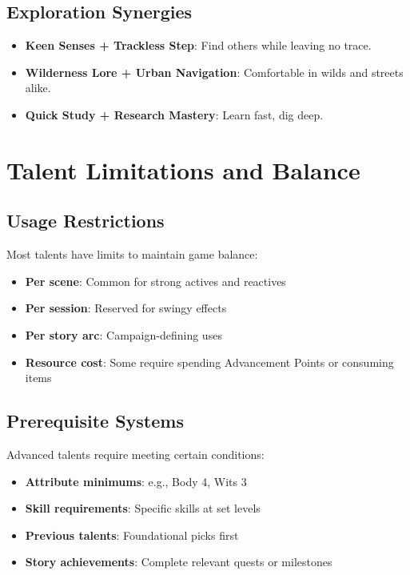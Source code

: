 \begin{multicols}{2}
\subsection*{Exploration Synergies}
\begin{itemize}
\item \textbf{Keen Senses + Trackless Step}: Find others while leaving no trace.
\item \textbf{Wilderness Lore + Urban Navigation}: Comfortable in wilds and streets alike.
\item \textbf{Quick Study + Research Mastery}: Learn fast, dig deep.
\end{itemize}

\section{Talent Limitations and Balance}

\subsection*{Usage Restrictions}
Most talents have limits to maintain game balance:
\begin{itemize}
\item \textbf{Per scene}: Common for strong actives and reactives
\item \textbf{Per session}: Reserved for swingy effects
\item \textbf{Per story arc}: Campaign-defining uses
\item \textbf{Resource cost}: Some require spending Advancement Points or consuming items
\end{itemize}

\subsection*{Prerequisite Systems}
Advanced talents require meeting certain conditions:
\begin{itemize}
\item \textbf{Attribute minimums}: e.g., Body 4, Wits 3
\item \textbf{Skill requirements}: Specific skills at set levels
\item \textbf{Previous talents}: Foundational picks first
\item \textbf{Story achievements}: Complete relevant quests or milestones
\end{itemize}


\end{multicols}
